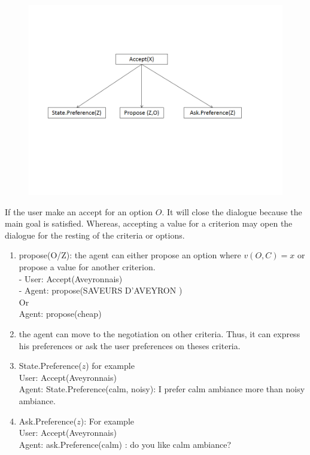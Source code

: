\documentclass{llncs}
\begin{document}
\begin{figure}
\centerline{\includegraphics[width=5in]{figs/accept.PNG}}
\end{figure}

If the user make an accept for an option $O$. It will close the dialogue because the main goal is satisfied. Whereas, accepting a value for a criterion may open the dialogue for the resting of the criteria or options. 
\begin{enumerate}
\item propose(O/Z): the agent can either propose an option where $v(O,C) =x$ or propose a value for another criterion.
\\ - User: Accept(Aveyronnais)
\\ - Agent: propose(SAVEURS D'AVEYRON )
\\Or
\\ Agent: propose(cheap)


\item the agent can move to the negotiation on other criteria. Thus, it can express his preferences or ask the user preferences on theses criteria. 

\item State.Preference($z$) for example
\\ User: Accept(Aveyronnais)
\\ Agent: State.Preference(calm, noisy): I prefer calm ambiance more than noisy ambiance.


\item Ask.Preference($z$): For example
\\ User: Accept(Aveyronnais)
\\ Agent: ask.Preference(calm) : do you like calm ambiance?
\end{enumerate}
\end{document}
